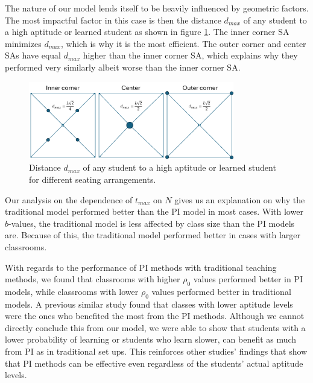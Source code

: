 The nature of our model lends itself to be heavily influenced by geometric factors. The most impactful factor in this case is then the distance $d_{max}$ of any student to a high aptitude or learned student as shown in figure \ref{fig:SA dmax}. The inner corner SA minimizes $d_{max}$, which is why it is the most efficient. The outer corner and center SAs have equal $d_{max}$ higher than the inner corner SA, which explains why they performed very similarly albeit worse than the inner corner SA.

\begin{figure}[htbp!]
    \centering
    \includegraphics[width=0.8\textwidth]{figures/SA dmax.png}
    \caption{Distance $d_{max}$ of any student to a high aptitude or learned student for different seating arrangements.}
    \label{fig:SA dmax}
\end{figure}

Our analysis on the dependence of $t_{max}$ on $N$ gives us an explanation on why the traditional model performed better than the PI model in most cases. With lower $b$-values, the traditional model is less affected by class size than the PI models are. Because of this, the traditional model performed better in cases with larger classrooms. 

With regards to the performance of PI methods with traditional teaching methods, we found that classrooms with higher $\rho_0$ values performed better in PI models, while classrooms with lower $\rho_0$ values performed better in traditional models. A previous similar study \cite{roxas2010seating} found that classes with lower aptitude levels were the ones who benefited the most from the PI methods. Although we cannot directly conclude this from our model, we were able to show that students with a lower probability of learning or students who learn slower, can benefit as much from PI as in traditional set ups. This reinforces other studies' findings \cite{lasry2008peer} that show that PI methods can be effective even regardless of the students' actual aptitude levels.

    
